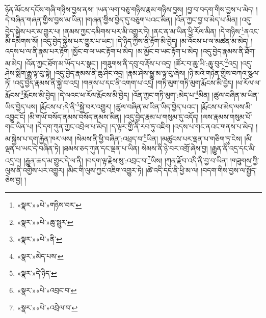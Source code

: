 ཉོན་མོངས་དངོས་གཞི་གཉིས་བྱས་ནས། །ཡན་ལག་བཅུ་གཉིས་རྣམ་གཉིས་བྱས། །བྱ་བ་བདག་གིས་བྱས་པ་མེད། །དེ་བཞིན་གཞན་གྱིས་བྱས་མ་ཡིན། །གཞན་གྱིས་བྱེད་དུ་བཅུག་པའང་མིན། །འོན་ཀྱང་བྱ་བ་མེད་པ་མིན། །འདུ་བྱེད་སྐྱེས་པར་མ་གྱུར་པ། །ནམས་ཀྱང་དམིགས་པར་མི་འགྱུར་ཏེ། །ནང་ན་མ་ཡིན་ཕྱི་རོལ་མིན། །དེ་གཉིས་\footnote{«སྣར་»«པེ་»གཉིས་བར་}ནའང་མི་དམིགས་སོ། །འདུ་བྱེད་སྐྱེས་པར་གྱུར་པ་ཡང་། །དེ་ཉིད་ཀྱིས་ནི་རྟོག་མི་བྱེད། །མ་འོངས་པ་ལ་མཚན་མ་མེད། །འདས་པ་ལ་ནི་རྣམ་པར་རྟོག །མྱོང་བ་ལ་ཡང་རྟོག་པ་མེད། །མ་མྱོང་བ་ཡང་རྟོག་པ་མེད། །འདུ་བྱེད་རྣམས་ནི་ཐོག་མ་མེད། །འོན་ཀྱང་ཐོག་མ་ཡོད་པར་སྣང་། །གཟུགས་ནི་དབུ་བ་རྡོས་པ་འདྲ། །ཚོར་བ་ཆུ་ཡི་:ཆུ་བུར་\footnote{«སྣར་»«པེ་»ཆུ་སྦུར་}འདྲ། །འདུ་ཤེས་སྨིག་རྒྱུ་ལྟ་བུ་སྟེ། །འདུ་བྱེད་རྣམས་ནི་ཆུ་ཤིང་འདྲ། །རྣམ་ཤེས་སྒྱུ་མ་ལྟ་བུ་ཞེས། །ཉི་མའི་གཉེན་གྱིས་བཀའ་སྩལ་ཏོ། །འདུ་བྱེད་རྣམས་ནི་སྐྱེ་བ་འདྲ། །གནས་པ་དང་ནི་འགག་པ་འདྲ། །གཏི་མུག་གཏི་མུག་རྨོངས་མི་བྱེད། །ཕ་རོལ་ལ་རྨོངས་\footnote{«སྣར་»«པེ་»ནི་}རྨོངས་མི་བྱེད། །དེ་ལའང་ཕ་རོལ་རྨོངས་མི་བྱེད། །འོན་ཀྱང་གཏི་མུག་:མེད་པ་\footnote{«སྣར་»མེད་པས་}མིན། །ཚུལ་བཞིན་མ་ཡིན་ཡིད་བྱེད་པས། །རྨོངས་པ་:དེ་ནི་\footnote{«སྣར་»དེ་ཉིད་}སྐྱེ་བར་འགྱུར། །ཚུལ་བཞིན་མ་ཡིན་ཡིད་བྱེད་པའང་། །རྨོངས་པ་མེད་ལས་མི་འབྱུང་ངོ། །མི་གཡོ་བསོད་ནམས་བསོད་ནམས་མིན། །འདུ་བྱེད་རྣམ་པ་གསུམ་དུ་འདོད། །ལས་རྣམས་གསུམ་པོ་གང་ཡིན་པ། །དེ་དག་ཀུན་ཀྱང་འབྲེལ་པ་མེད། །ད་ལྟར་གྱི་ནི་རབ་ཏུ་འཇིག །འདས་པ་གང་ནའང་གནས་པ་མེད། །མ་སྐྱེས་པ་དག་རྐྱེན་ཁར་ལས། །སེམས་ནི་ཕྱི་བཞིན་:འཕྲད་བ་\footnote{«སྣར་»«པེ་»འབྲང་བ་}ཡིན། །མཚུངས་པར་ལྡན་པ་གཅིག་ཏུ་ངེས། །མི་ལྡན་པ་ཡང་དེ་བཞིན་ཏེ། །ཐམས་ཅད་ཀུན་དང་ལྡན་པ་ཡིན། སེམས་ནི་ཉེ་བར་འགྲོ་ཞེས་བྱ། །རྒྱུན་ནི་འདྲ་དང་མི་འདྲ་བ། །རྒྱུན་ཆད་མ་གྱུར་དེ་ལ་ནི། །བདག་ལྟ་རྗེས་སུ་:འབྲང་བ་\footnote{«སྣར་»«པེ་»འབྲེལ་བ་}ཡིས། །ཀུན་རྫོབ་འདི་ནི་བྱ་བ་ཡིན། །གཟུགས་ཀྱི་ལུས་ནི་འགྱེས་པར་འགྱུར། །མིང་གི་ལུས་ཀྱང་འཇིག་འགྱུར་ཏེ། །ཚེ་འདི་དང་ནི་ཕྱི་མ་ལ། །བདག་གིས་བྱས་ལ་སྤྱོད་ཅེས་བྱ། །
